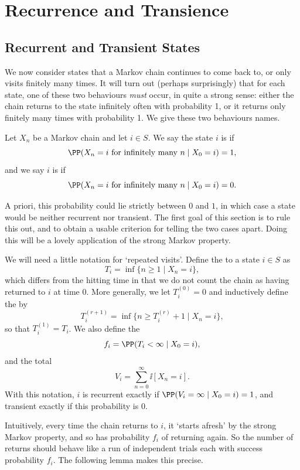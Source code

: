 \section{Recurrence and Transience}

\subsection{Recurrent and Transient States}

We now consider states that a Markov chain continues to come back to, or only visits finitely many times. It will turn out (perhaps surprisingly) that for each state, one of these two behaviours \emph{must} occur, in quite a strong sense: either the chain returns to the state infinitely often with probability 1, or it returns only finitely many times with probability 1. We give these two behaviours names.

\begin{definition}
	Let $X_n$ be a Markov chain and let $i \in S$. We say the state $i$ is  if
	$$
	\PP(X_n = i \text{ for infinitely many } n \mid X_0 = i) = 1,
	$$
	and we say $i$ is  if
	$$
	\PP(X_n = i \text{ for infinitely many } n \mid X_0 = i) = 0.
	$$
\end{definition}

A priori, this probability could lie strictly between $0$ and $1$, in which case a state would be neither recurrent nor transient. The first goal of this section is to rule this out, and to obtain a usable criterion for telling the two cases apart. Doing this will be a lovely application of the strong Markov property.

We will need a little notation for `repeated visits'. Define the  to a state $i \in S$ as
$$
T_i = \inf\{n \geq 1 \mid X_n = i\},
$$
which differs from the hitting time in that we do not count the chain as having returned to $i$ at time 0. More generally, we let $T_i^{(0)} = 0$ and inductively define the  by
$$
T_i^{(r + 1)} = \inf\{n \geq T_i^{(r)} + 1 \mid X_n = i\},
$$
so that $T_i^{(1)} = T_i$. We also define the 
$$
f_i = \PP(T_i < \infty \mid X_0 = i),
$$
and the total 
$$
V_i = \sum_{n = 0}^{\infty} \ii[X_n = i].
$$
With this notation, $i$ is recurrent exactly if $\PP(V_i = \infty \mid X_0 = i) = 1$, and transient exactly if this probability is 0.

Intuitively, every time the chain returns to $i$, it `starts afresh' by the strong Markov property, and so has probability $f_i$ of returning again. So the number of returns should behave like a run of independent trials each with success probability $f_i$. The following lemma makes this precise.

